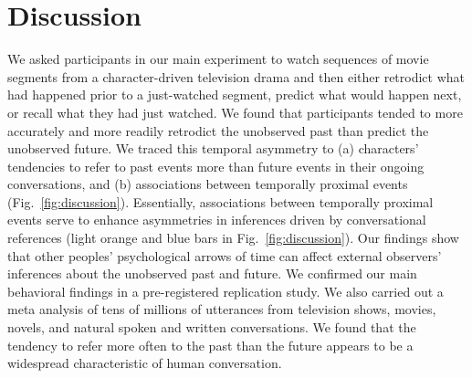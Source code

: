 \documentclass[10pt]{article}
\begin{document}
\section*{Discussion}

We asked participants in our main experiment to watch sequences of movie segments from a character-driven television drama and then either retrodict what had happened prior to a just-watched segment, predict what would happen next, or recall what they had just watched. We found that participants tended to more accurately and more readily retrodict the unobserved past than predict the unobserved future. We traced this temporal asymmetry to (a) characters' tendencies to refer to past events more than future events in their ongoing conversations, and (b) associations between temporally proximal events (Fig.~\ref{fig:discussion}). Essentially, associations between temporally proximal events serve to enhance asymmetries in inferences driven by conversational references (light orange and blue bars in Fig.~\ref{fig:discussion}). Our findings show that other peoples' psychological arrows of time can affect external observers' inferences about the unobserved past and future. We confirmed our main behavioral findings in a pre-registered replication study. We also carried out a meta analysis of tens of millions of utterances from television shows, movies, novels, and natural spoken and written conversations. We found that the tendency to refer more often to the past than the future appears to be a widespread characteristic of human conversation.
\end{document}
